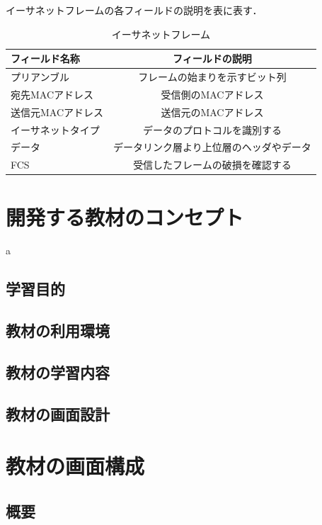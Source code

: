 \documentclass[12pt,a4j,titlepage]{ltjsarticle}
\begin{document}
イーサネットフレームの各フィールドの説明を表に表す．
\\
\begin{table}[hbtp]
  \caption{イーサネットフレーム}
  \label{table:ipv}
  \centering
  \begin{tabular}{|l|c|}
    \hline
    フィールド名称  & フィールドの説明  \\
    \hline
    \hline 
    プリアンブル  & フレームの始まりを示すビット列 \\
    \hline 
    宛先MACアドレス  & 受信側のMACアドレス \\
    \hline 
    送信元MACアドレス  &  送信元のMACアドレス\\
    \hline 
    イーサネットタイプ  & データのプロトコルを識別する \\
    \hline 
    データ  & データリンク層より上位層のヘッダやデータ \\
    \hline 
    FCS  & 受信したフレームの破損を確認する \\
    \hline
  \end{tabular}
\end{table}

\clearpage

\section{開発する教材のコンセプト}%
a
\subsection{学習目的}
\subsection{教材の利用環境}
\subsection{教材の学習内容}
\subsection{教材の画面設計}

\clearpage

\section{教材の画面構成}%
\subsection{概要}
\end{document}
